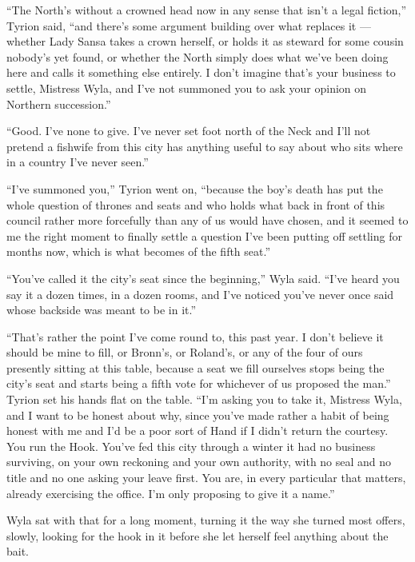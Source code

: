 “The North’s without a crowned head now in any sense that isn’t a legal fiction,” Tyrion said, “and there’s some argument building over what replaces it — whether Lady Sansa takes a crown herself, or holds it as steward for some cousin nobody’s yet found, or whether the North simply does what we’ve been doing here and calls it something else entirely. I don’t imagine that’s your business to settle, Mistress Wyla, and I’ve not summoned you to ask your opinion on Northern succession.”

“Good. I’ve none to give. I’ve never set foot north of the Neck and I’ll not pretend a fishwife from this city has anything useful to say about who sits where in a country I’ve never seen.”

“I’ve summoned you,” Tyrion went on, “because the boy’s death has put the whole question of thrones and seats and who holds what back in front of this council rather more forcefully than any of us would have chosen, and it seemed to me the right moment to finally settle a question I’ve been putting off settling for months now, which is what becomes of the fifth seat.”

\sceneBreak

“You’ve called it the city’s seat since the beginning,” Wyla said. “I’ve heard you say it a dozen times, in a dozen rooms, and I’ve noticed you’ve never once said whose backside was meant to be in it.”

“That’s rather the point I’ve come round to, this past year. I don’t believe it should be mine to fill, or Bronn’s, or Roland’s, or any of the four of ours presently sitting at this table, because a seat we fill ourselves stops being the city’s seat and starts being a fifth vote for whichever of us proposed the man.” Tyrion set his hands flat on the table. “I’m asking you to take it, Mistress Wyla, and I want to be honest about why, since you’ve made rather a habit of being honest with me and I’d be a poor sort of Hand if I didn’t return the courtesy. You run the Hook. You’ve fed this city through a winter it had no business surviving, on your own reckoning and your own authority, with no seal and no title and no one asking your leave first. You are, in every particular that matters, already exercising the office. I’m only proposing to give it a name.”

\sceneBreak

Wyla sat with that for a long moment, turning it the way she turned most offers, slowly, looking for the hook in it before she let herself feel anything about the bait.

